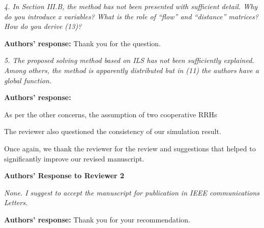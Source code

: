 \documentclass[onecolumn, 11pt, draftclsnofoot]{IEEEtran}
\begin{document}
\noindent
\emph{4. In Section III.B, the method has not been presented with sufficient
detail. Why do you introduce x variables? What is the role of “flow” and
“distance” matrices? How do you derive (13)?}

\noindent \textbf{Authors' response:}
Thank you for the question.


\vspace{0.5cm}

\noindent
\emph{5. The proposed solving method based on ILS has not been sufficiently
explained. Among others, the method is apparently distributed but in (11) the
authors have a global function.}

\noindent \textbf{Authors' response:}

\vspace{0.5cm}


As per the other concerns, the assumption of two cooperative RRHs

The reviewer also questioned the consistency of our simulation result.

Once again, we thank the reviewer for the review and suggestions that helped to
significantly improve our revised manuscript.



\newpage
\begin{center}
{\LARGE \textbf{Authors' Response to Reviewer 2}}
\end{center}

\noindent
\emph{None. I suggest to accept the manuscript for publication in IEEE
communications Letters.}

\noindent \textbf{Authors' response:}
Thank you for your recommendation.

\vspace{0.5cm}



\end{document}
